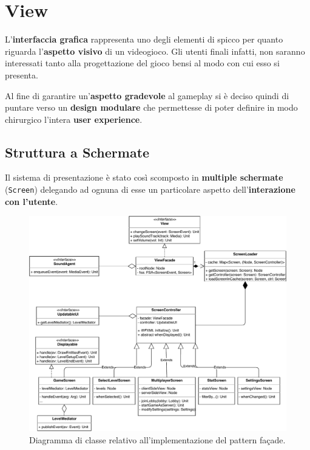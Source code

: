 \section{View}
\label{sec:view_design}

L'\textbf{interfaccia grafica} rappresenta uno degli elementi di spicco per quanto riguarda l'\textbf{aspetto visivo} di un videogioco. Gli utenti finali infatti, non saranno interessati tanto alla progettazione del gioco bensi al modo con cui esso si presenta.

Al fine di garantire un'\textbf{aspetto gradevole} al gameplay si è deciso quindi di puntare verso un \textbf{design modulare} che permettesse di poter definire in modo chirurgico l'intera \textbf{user experience}.

\subsection{Struttura a Schermate}
Il sistema di presentazione è stato così scomposto in \textbf{multiple schermate} (\texttt{Screen}) delegando ad ognuna di esse un particolare aspetto dell'\textbf{interazione con l'utente}.

\begin{figure}[H]
	\centering
	\includegraphics[width=0.99\columnwidth]{drawio/viewFacade/viewFacade.pdf}
	\caption{Diagramma di classe relativo all'implementazione del pattern façade.}
	\label{fig:viewFacade}
\end{figure}


